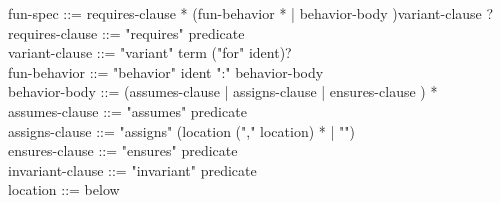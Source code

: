 \begin{syntax}
  fun-spec ::= requires-clause * (fun-behavior * | behavior-body )variant-clause ? \\
  requires-clause ::= "requires" predicate \\
  variant-clause ::= "variant" term ("for" ident)? \\
  fun-behavior ::= "behavior" ident ":" behavior-body \\
  behavior-body ::= (assumes-clause | assigns-clause |
              ensures-clause ) * \\
  assumes-clause ::= "assumes" predicate \\
  assigns-clause ::= "assigns" (location ("," location) * |
  "\nothing") \\
  ensures-clause ::= "ensures" predicate \\
  invariant-clause ::= "invariant" predicate \\
  location ::= below
\end{syntax}
